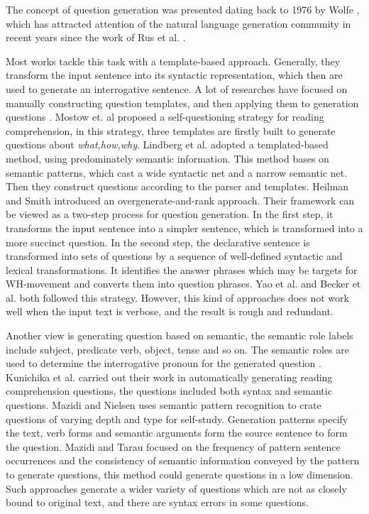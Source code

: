 \documentclass[runningheads,UTF8,article]{comsis2}
\newcommand\revised[1]{{\color{red} #1}}
\begin{document}
	
	The concept of question generation was presented dating back to 1976 by Wolfe \cite{wolfe},	which has attracted attention of the natural language generation community in recent years since the work of Rus et al. \cite{rus2010first}.
	
	
	Most works tackle this task with a template-based approach. Generally, they transform the input sentence into its syntactic representation, which then are used to generate an interrogative sentence. A lot of researches have focused on manually constructing question templates, and then applying them to generation questions \cite{mostow2009generating,lindberg2013generating,heilman2010good}. 
	Mostow et. al \cite{mostow2009generating} proposed a self-questioning strategy for \revised{reading comprehension}, in this strategy, three templates are firstly built to generate questions about \emph{what,how,why}. Lindberg et al.\cite{lindberg2013generating} adopted a templated-based method, using predominately semantic information.
	This method bases on semantic patterns, which cast a wide syntactic net and a narrow semantic net. Then they construct questions according to the parser and templates. Heilman and Smith \cite{heilman2010good} introduced an overgenerate-and-rank approach. \revised{Their framework can be viewed as a two-step process for question generation.  In the first step, it transforms the input sentence into a simpler sentence, which is transformed into a more succinct question. In the second step, the declarative sentence is transformed into sets of questions by a sequence of well-defined syntactic and lexical transformations. It identifies the answer phrases which may be targets for WH-movement and converts them into question phrases}. Yao et al. \cite{yao} and Becker et al.\cite{becker} both followed this strategy. However, this kind of approaches does not work well when the input text is verbose, and the result is rough and redundant.
	
	
	
	Another view is generating question based on semantic, the semantic role labels include subject, predicate verb, object, tense and so on. The semantic roles are used to determine the interrogative pronoun for the generated question \cite{Kunichika2001AutomatedQG,infusing,mazidi2014linguistic}. Kunichika et al. \cite{Kunichika2001AutomatedQG} carried out their work in automatically generating reading comprehension questions, the questions included both syntax and semantic questions.
	Mazidi and Nielsen \cite{mazidi2014linguistic} uses semantic pattern recognition to crate questions of varying depth and type for self-study. Generation patterns specify the text, verb forms and semantic arguments form the source sentence to form the question. Mazidi and Tarau \cite{infusing} focused on the frequency of pattern sentence occurrences and the consistency of semantic information conveyed by the pattern to generate questions, this method could generate questions in a low dimension. Such approaches generate a wider variety of questions which are not as closely bound to original text, and there are syntax errors in some questions.
	
\end{document}
